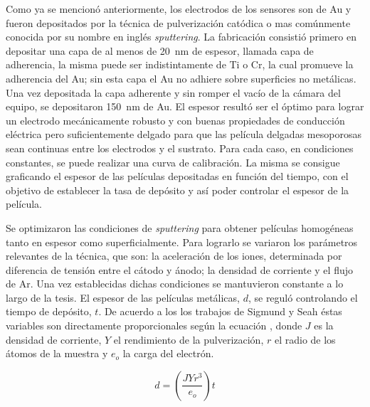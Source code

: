 		 Como ya se mencionó anteriormente, los electrodos de los sensores son de Au y fueron depositados por la técnica de pulverización catódica o mas comúnmente conocida por su nombre en inglés \textit{sputtering}. La fabricación consistió primero en depositar una capa de al menos de \SI{20}{\nm} de espesor, llamada capa de  adherencia, la misma puede ser indistintamente de Ti o Cr, la cual promueve la adherencia del Au; sin esta capa el Au no adhiere sobre superficies no metálicas.\cite{Hieber1976} Una vez depositada la capa adherente y sin romper el vacío de la cámara del equipo, se depositaron \SI{150}{nm} de Au. El espesor resultó ser el óptimo para lograr un electrodo mecánicamente robusto y con buenas propiedades de conducción eléctrica pero suficientemente delgado para que las película delgadas mesoporosas sean continuas entre los electrodos y el sustrato. Para cada caso, en condiciones constantes, se puede realizar una curva de calibración. La misma se consigue graficando el espesor de las películas depositadas en función del tiempo, con el objetivo de establecer la tasa de depósito y así poder controlar el espesor de la película. 

		 Se optimizaron las condiciones de \textit{sputtering} para obtener películas homogéneas tanto en espesor como superficialmente. Para lograrlo se variaron los parámetros relevantes de la técnica, que son: la aceleración de los iones, determinada por diferencia de tensión entre el cátodo y ánodo; la densidad de corriente y el flujo de Ar. Una vez establecidas dichas condiciones se mantuvieron constante a lo largo de la tesis. El espesor de las películas metálicas, $d$, se reguló controlando el tiempo de depósito, $t$. De acuerdo a los los trabajos de Sigmund\cite{sigmund1968} y Seah\cite{Seah2005} éstas variables son directamente proporcionales según la ecuación \label{eq:sputt}, donde $J$ es la densidad de corriente, $Y$ el rendimiento de la pulverización, $r$ el radio de los átomos de la muestra y $e_o$ la carga del electrón.

	 			\begin{equation}
	 				d=\left(\frac{JYr^3}{e_o}\right)t
	 				\label{eq:sputt}
	 			\end{equation}

